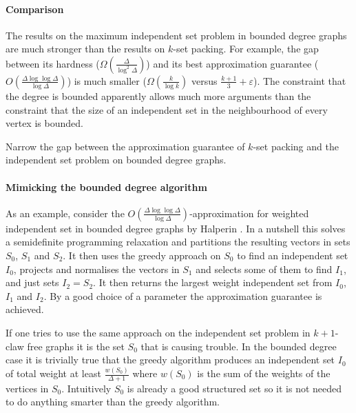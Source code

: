 \paragraph{Comparison} The results on the maximum independent set problem in bounded degree graphs are much stronger than the results on $k$-set packing. For example, the gap between its hardness ($\Omega \left( \frac{\Delta}{\log^2 \Delta} \right)$) and its best approximation guarantee ($O \left( \frac{\Delta \log \log \Delta}{\log \Delta} \right)$) is much smaller ($\Omega(\frac{k}{\log k})$ versus $\frac{k+1}{3} + \varepsilon$). The constraint that the degree is bounded apparently allows much more arguments than the constraint that the size of an independent set in the neighbourhood of every vertex is bounded. %

\begin{prob}
Narrow the gap between the approximation guarantee of $k$-set packing and the independent set problem on bounded degree graphs.
\end{prob}

\paragraph{Mimicking the bounded degree algorithm} As an example, consider the $O \left( \frac{\Delta \log \log \Delta}{\log \Delta} \right)$-approximation for weighted independent set in bounded degree graphs by Halperin \cite[Section 5]{Halperin}. In a nutshell this solves a semidefinite programming relaxation and partitions the resulting vectors in sets $S_0$, $S_1$ and $S_2$. It then uses the greedy approach on $S_0$ to find an independent set $I_0$, projects and normalises the vectors in $S_1$ and selects some of them to find $I_1$, and just sets $I_2 = S_2$. It then returns the largest weight independent set from $I_0$, $I_1$ and $I_2$. By a good choice of a parameter the approximation guarantee is achieved.

If one tries to use the same approach on the independent set problem in $k+1$-claw free graphs it is the set $S_0$ that is causing trouble. In the bounded degree case it is trivially true that the greedy algorithm produces an independent set $I_0$ of total weight at least $\frac{w(S_0)}{\Delta+1}$ where $w(S_0)$ is the sum of the weights of the vertices in $S_0$. %
Intuitively $S_0$ is already a good structured set so it is not needed to do anything smarter than the greedy algorithm.

